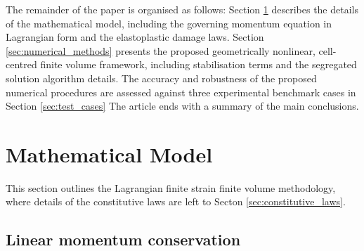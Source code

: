 \documentclass[sn-mathphys,Numbered,draft]{sn-jnl}%
\begin{document}
The remainder of the paper is organised as follows:
Section \ref{sec:math_model} describes the details of the mathematical model, including the governing momentum equation in Lagrangian form and the elastoplastic damage laws.
Section \ref{sec:numerical_methods} presents the proposed geometrically nonlinear, cell-centred finite volume framework, including stabilisation terms and the segregated solution algorithm details.
The accuracy and robustness of the proposed numerical procedures are assessed against three experimental benchmark cases in Section \ref{sec:test_cases}
The article ends with a summary of the main conclusions.


\section{Mathematical Model}\label{sec:math_model}

This section outlines the Lagrangian finite strain finite volume methodology, where details of the constitutive laws are left to Secton \ref{sec:constitutive_laws}.

\subsection{Linear momentum conservation}
\end{document}
